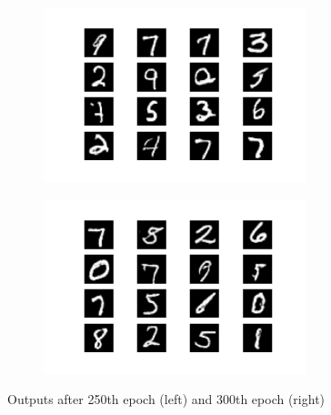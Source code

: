 \documentclass{article}
\begin{document}
\begin{appendices}
\begin{figure}[H]
\centering
\begin{subfigure}{.5\textwidth}
  \centering
  \includegraphics[width=3in]{csci-8110/hw-4/images/generated_plot_e250.png}
  \label{fig:ep250}
\end{subfigure}%
\begin{subfigure}{.5\textwidth}
  \centering
  \includegraphics[width=3in]{csci-8110/hw-4/images/generated_plot_e300.png}
  \label{fig:ep300}
\end{subfigure}
\caption{Outputs after 250th epoch (left) and 300th epoch (right)}
\label{fig:ep20-100}
\end{figure}


\end{appendices}
\end{document}
